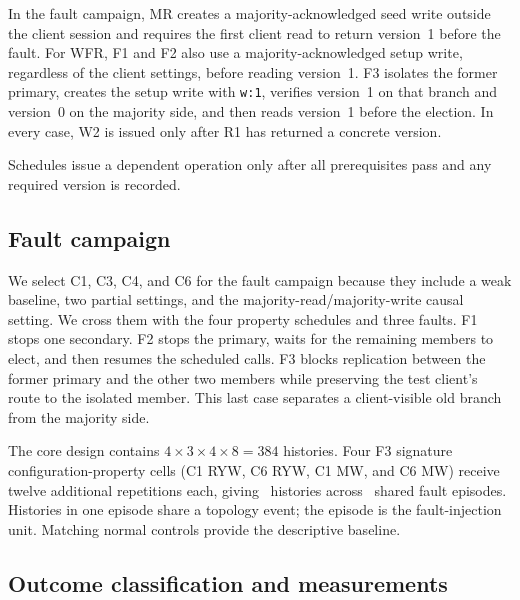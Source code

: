 In the fault campaign, MR creates a majority-acknowledged seed write outside
the client session and requires the first client read to return version~1
before the fault. For WFR, F1 and F2 also use a majority-acknowledged setup
write, regardless of the client settings, before reading version~1.
F3 isolates the former primary,
creates the setup write with \texttt{w:1}, verifies version~1 on that branch
and version~0 on the majority side, and then reads version~1 before the
election. In every case, W2 is issued only after R1 has returned a concrete
version.

Schedules issue a dependent operation only after all prerequisites pass and
any required version is recorded.


\subsection{Fault campaign}

We select C1, C3, C4, and C6 for the fault campaign because they include a
weak baseline, two partial settings, and the majority-read/majority-write
causal setting. We cross them with the four property schedules and three
faults. F1 stops one secondary. F2 stops the primary, waits for the remaining
members to elect, and then resumes the scheduled calls. F3 blocks replication
between the former primary and the other two members while preserving the
test client's route to the isolated member. This last case separates a
client-visible old branch from the majority side.

The core design contains \(4\times3\times4\times8=384\) histories. Four F3
signature configuration-property cells (C1 RYW, C6 RYW, C1 MW, and C6 MW) receive twelve additional repetitions each, giving
\RQTwoHistoryCount\ histories across \RQTwoFaultEpisodeCount\ shared fault
episodes. Histories in one episode share a topology event; the episode is the
fault-injection unit. Matching normal controls provide the descriptive baseline.

\FloatBarrier
\subsection{Outcome classification and measurements}


